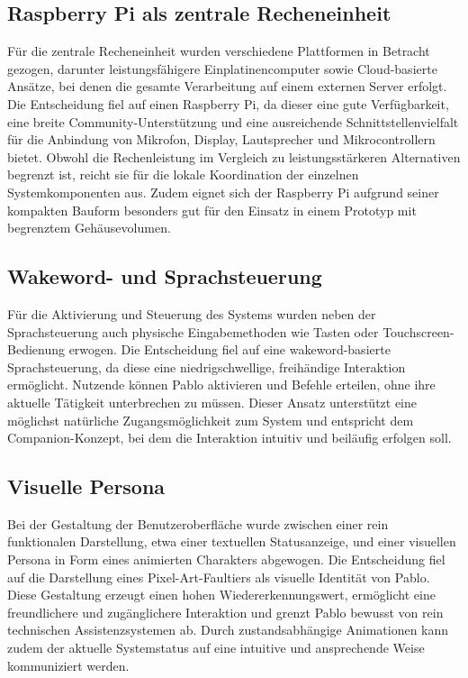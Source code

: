 \subsection{Raspberry Pi als zentrale Recheneinheit}

Für die zentrale Recheneinheit wurden verschiedene Plattformen in Betracht gezogen, darunter leistungsfähigere Einplatinencomputer sowie Cloud-basierte Ansätze, bei denen die gesamte Verarbeitung auf einem externen Server erfolgt.
Die Entscheidung fiel auf einen Raspberry Pi, da dieser eine gute Verfügbarkeit, eine breite Community-Unterstützung und eine ausreichende Schnittstellenvielfalt für die Anbindung von Mikrofon, Display, Lautsprecher und Mikrocontrollern bietet.
Obwohl die Rechenleistung im Vergleich zu leistungsstärkeren Alternativen begrenzt ist, reicht sie für die lokale Koordination der einzelnen Systemkomponenten aus.
Zudem eignet sich der Raspberry Pi aufgrund seiner kompakten Bauform besonders gut für den Einsatz in einem Prototyp mit begrenztem Gehäusevolumen.

\subsection{Wakeword- und Sprachsteuerung}

Für die Aktivierung und Steuerung des Systems wurden neben der Sprachsteuerung auch physische Eingabemethoden wie Tasten oder Touchscreen-Bedienung erwogen.
Die Entscheidung fiel auf eine wakeword-basierte Sprachsteuerung, da diese eine niedrigschwellige, freihändige Interaktion ermöglicht.
Nutzende können Pablo aktivieren und Befehle erteilen, ohne ihre aktuelle Tätigkeit unterbrechen zu müssen.
Dieser Ansatz unterstützt eine möglichst natürliche Zugangsmöglichkeit zum System und entspricht dem Companion-Konzept, bei dem die Interaktion intuitiv und beiläufig erfolgen soll.

\subsection{Visuelle Persona}

Bei der Gestaltung der Benutzeroberfläche wurde zwischen einer rein funktionalen Darstellung, etwa einer textuellen Statusanzeige, und einer visuellen Persona in Form eines animierten Charakters abgewogen.
Die Entscheidung fiel auf die Darstellung eines Pixel-Art-Faultiers als visuelle Identität von Pablo.
Diese Gestaltung erzeugt einen hohen Wiedererkennungswert, ermöglicht eine freundlichere und zugänglichere Interaktion und grenzt Pablo bewusst von rein technischen Assistenzsystemen ab.
Durch zustandsabhängige Animationen kann zudem der aktuelle Systemstatus auf eine intuitive und ansprechende Weise kommuniziert werden.

